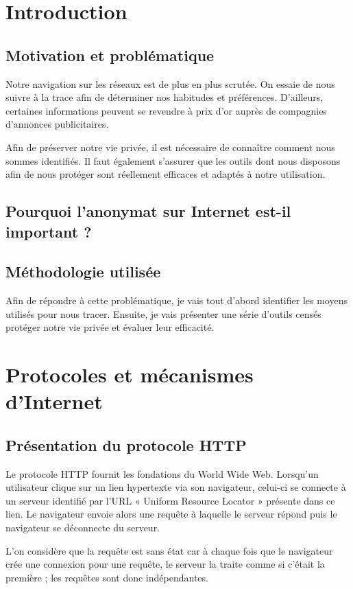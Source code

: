 \documentclass[a4paper,12pt,french]{report}
\begin{document}
\tableofcontents
\thispagestyle{empty}

\chapter{Introduction}
\section{Motivation et problématique}
Notre navigation sur les réseaux est de plus en plus scrutée. On essaie de nous suivre à la trace afin de déterminer nos habitudes et préférences. D'ailleurs, certaines informations peuvent se revendre à prix d'or auprès de compagnies d'annonces publicitaires.

Afin de préserver notre vie privée, il est nécessaire de connaître comment nous sommes identifiés. Il faut également s'assurer que les outils dont nous disposons afin de nous protéger sont réellement efficaces et adaptés à notre utilisation.

\section{Pourquoi l'anonymat sur Internet est-il important ?}

\section{Méthodologie utilisée}
Afin de répondre à cette problématique, je vais tout d'abord identifier les moyens utilisés pour nous tracer. Ensuite, je vais présenter une série d'outils censés protéger notre vie privée et évaluer leur efficacité.


\chapter{Protocoles et mécanismes d'Internet}
\section{Présentation du protocole HTTP}
Le protocole HTTP fournit les fondations du World Wide Web. Lorsqu'un utilisateur clique sur un lien hypertexte via son navigateur, celui-ci se connecte à un serveur identifié par l'URL « Uniform Resource Locator » présente dans ce lien. Le navigateur envoie alors une requête à laquelle le serveur répond puis le navigateur se déconnecte du serveur.

L'on considère que la requête est sans état car à chaque fois que le navigateur crée une connexion pour une requête, le serveur la traite comme si c'était la première ; les requêtes sont donc indépendantes.
\end{document}
